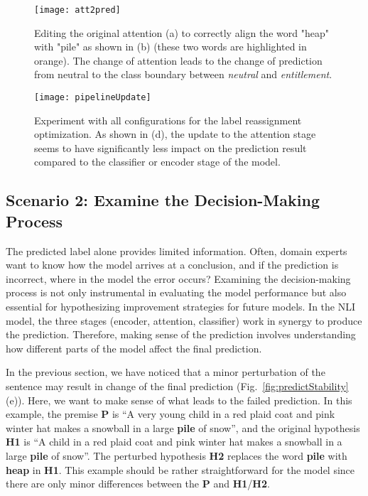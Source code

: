 \begin{figure}[htbp]
\centering
\vspace{-2mm}
 \texttt{[image: att2pred]}
 \vspace{-6mm}
 \caption{
Editing the original attention (a) to correctly align the word "heap" with "pile" as shown in (b) (these two words are highlighted in orange).
The change of attention leads to the change of prediction from neutral to the class boundary between \emph{neutral} and \emph{entitlement}.
%
}
\label{fig:att2pred}
\end{figure}

\begin{figure*}[t]
\centering
\vspace{-2mm}
 \texttt{[image: pipelineUpdate]}
  \vspace{-6mm}
 \caption{
Experiment with all configurations for the label reassignment optimization. As shown in (d), the update to the attention stage seems to have significantly less impact on the prediction result compared to the classifier or encoder stage of the model.
 }
  \vspace{-4mm}
\label{fig:pipelineUpdate}
\end{figure*}

\subsection{Scenario 2: Examine the Decision-Making Process}
The predicted label alone provides limited information. Often, domain experts want to know how the model arrives at a conclusion, and if the prediction is incorrect, where in the model the error occurs?
Examining the decision-making process is not only instrumental in evaluating the model performance but also essential for hypothesizing improvement strategies for future models.
%
In the NLI model, the three stages (encoder, attention, classifier) work in synergy to produce the prediction.
Therefore, making sense of the prediction involves understanding how different parts of the model affect the final prediction.

In the previous section, we have noticed that a minor perturbation of the sentence may result in change of the final prediction (Fig.~\ref{fig:predictStability}(e)). Here, we want to make sense of what leads to the failed prediction. In this example, the premise \textbf{P} is ``A very young child in a red plaid coat and pink winter hat makes a snowball in a large \textbf{pile} of snow'', and the original hypothesis \textbf{H1} is ``A child in a red plaid coat and pink winter hat makes a snowball in a large \textbf{pile} of snow''. The perturbed hypothesis \textbf{H2} replaces the word \textbf{pile} with \textbf{heap} in \textbf{H1}. This example should be rather straightforward for the model since there are only minor differences between the \textbf{P} and \textbf{H1}/\textbf{H2}.

